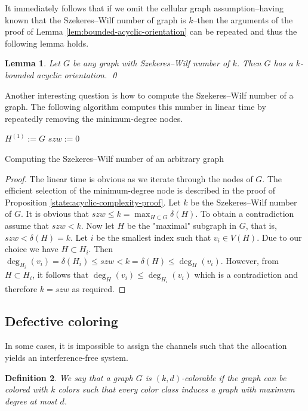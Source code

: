 \documentclass[a4paper, 12pt]{article}
\newtheorem{lem}{Lemma}[section]
\newtheorem{defin}[lem]{Definition}
\begin{document}
It immediately follows that if we omit the cellular graph assumption\---having known that the Szekeres\---Wilf number of graph is $k$\---then the arguments of the proof of Lemma \ref{lem:bounded-acyclic-orientation} can be repeated and thus the following lemma holds.

\begin{lem}\label{lem:szekeres} Let $G$ be any graph with Szekeres\---Wilf number of $k$. Then $G$ has a $k$-bounded acyclic orientation. \qed
\end{lem}

Another interesting question is how to compute the Szekeres\---Wilf number of a graph. The following algorithm \cite{Matula:1983:SOC:2402.322385} computes this number in linear time by repeatedly removing the minimum-degree nodes.

\begin{algorithm}[h!]\label{alg:szekeres-wilf-computation}
 $H^{(1)} := G$\;
 $szw := 0$\;
 \caption{Computing the Szekeres\---Wilf number of an arbitrary graph}
\end{algorithm}
\begin{proof}
The linear time is obvious as we iterate through the nodes of $G$. The efficient selection of the minimum-degree node is described in the proof of Proposition \ref{state:acyclic-complexity-proof}. Let $k$ be the Szekeres\---Wilf number of $G$. It is obvious that $szw \leqslant k = \max_{H \subset G} \delta(H)$. To obtain a contradiction assume that $szw < k$. Now let $H$ be the "maximal" subgraph in $G$, that is, $szw < \delta(H) = k$. Let $i$ be the smallest index such that $v_i \in V(H)$. Due to our choice we have $H \subset H_i$. Then $\deg_{H_i}(v_i) = \delta(H_i) \leqslant szw < k = \delta(H) \leqslant \deg_H(v_i)$. However, from $H \subset H_i$, it follows that $\deg_H(v_i) \leqslant \deg_{H_i}(v_i)$ which is a contradiction and therefore $k = szw$ as required.
\end{proof}

\subsection{Defective coloring}\label{sec:defective}
In some cases, it is impossible to assign the channels such that the allocation yields an interference-free system. 
\begin{defin} We say that a graph $G$ is $(k,d)$-colorable if the graph can be colored with $k$ colors such that every color class induces a graph with maximum degree at most $d$.
\end{defin}
\end{document}
